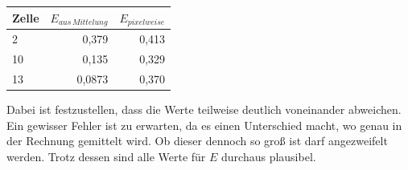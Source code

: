 \begin{center}
    \centering
    \begin{tabular}{l|r|r}
        Zelle & $E_{aus \, Mittelung}$ & $E_{pixelweise}$\\
        \hline
        2 & 0,379 & 0,413\\
        10 & 0,135 & 0,329\\
        13 & 0,0873 & 0,370\\
    \end{tabular}
    \label{tab:VerglE}
\end{center}

Dabei ist festzustellen, dass die Werte teilweise deutlich voneinander abweichen. Ein gewisser Fehler ist zu erwarten, da es einen Unterschied macht, wo 
genau in der Rechnung gemittelt wird. Ob dieser dennoch so groß ist darf angezweifelt werden. Trotz dessen sind alle Werte für $E$ durchaus 
plausibel.

\clearpage